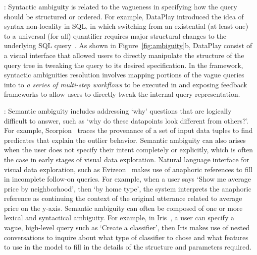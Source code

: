 : Syntactic ambiguity is related to the vagueness in specifying how the query should be structured or ordered. For example, DataPlay introduced the idea of syntax non-locality in SQL, in which switching from an existential (at least one) to a universal (for all) quantifier requires major structural changes to the underlying SQL query~\cite{Abouzied2012}. As shown in Figure~\ref{fig:ambiguity}b, DataPlay consist of a visual interface that allowed users to directly manipulate the structure of the query tree in tweaking the query to its desired specification. In the \vida framework, syntactic ambiguities resolution involves mapping portions of the vague queries into to \textit{a series of multi-step workflows} to be executed in \vidaql and exposing feedback frameworks to allow users to directly tweak the internal query representation. %

: Semantic ambiguity includes addressing `why' questions that are logically difficult to answer, such as `why do these datapoints look different from others?'. For example, Scorpion~\cite{Wu2013} traces the provenance of a set of input data tuples to find predicates that explain the outlier behavior. Semantic ambiguity can also arises when the user does not specify their intent completely or explicitly, which is often the case in early stages of visual data exploration. Natural language interface for visual data exploration, such as Evizeon~\cite{Hoque2017} makes use of anaphoric references to fill in incomplete follow-on queries. For example, when a user says `Show me average price by neighborhood', then `by home type', the system interprets the anaphoric reference as continuing the context of the original utterance related to average price on the y-axis. Semantic ambiguity can often be composed of one or more lexical and syntactical ambiguity. For example, in Iris~\cite{Fast2018}, a user can specify a vague, high-level query such as `Create a classifier', then Iris makes use of nested conversations to inquire about what type of classifier to chose and what features to use in the model to fill in the details of the structure and parameters required. 


